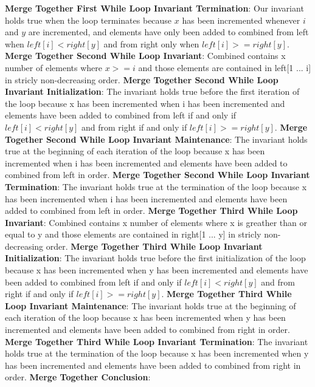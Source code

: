 \documentclass[onecolumn, 12pt, article]{IEEEtran}
\numberwithin{case}{problem}
\numberwithin{condition}{problem}
\numberwithin{condition}{subsection}
\numberwithin{definition}{section}
\theoremstyle{remark}
\numberwithin{question}{problem}
\theoremstyle{plain}
\numberwithin{answer}{problem}
\numberwithin{solution}{section}
\numberwithin{equation}{section}%
\begin{document}
\textbf{Merge Together First While Loop Invariant Termination}: Our invariant holds true when the loop terminates because $x$ has been incremented whenever $i$ and $y$ are incremented, and elements have only been added to combined from left when $left[i] < right[y]$ and from right only when $left[i] >= right[y]$.
\newline
\newline
\textbf{Merge Together Second While Loop Invariant}: Combined contains x number of elements where $x >= i$ and those elements are contained in left[1 ... i] in stricly non-decreasing order.
\newline
\textbf{Merge Together Second While Loop Invariant Initialization}: The invariant holds true before the first iteration of the loop because x has been incremented when i has been incremented and elements have been added to combined from left if and only if $left[i] < right[y]$ and from right if and only if $left[i] >= right[y]$.
\newline
\textbf{Merge Together Second While Loop Invariant Maintenance}: The invariant holds true at the beginning of each iteration of the loop because x has been incremented when i has been incremented and elements have been added to combined from left in order.
\newline
\textbf{Merge Together Second While Loop Invariant Termination}: The invariant holds true at the termination of the loop because x has been incremented when i has been incremented and elements have been added to combined from left in order.
\newline
\newline
\textbf{Merge Together Third While Loop Invariant}: Combined contains x number of elements where x is greather than or equal to y and those elements are contained in right[1 ... y] in stricly non-decreasing order.
\newline
\textbf{Merge Together Third While Loop Invariant Initialization}: The invariant holds true before the first initialization of the loop because x has been incremented when y has been incremented and elements have been added to combined from left if and only if $left[i] < right[y]$ and from right if and only if $left[i] >= right[y]$.
\newline
\textbf{Merge Together Third While Loop Invariant Maintenance}: The invariant holds true at the beginning of each iteration of the loop because x has been incremented when y has been incremented and elements have been added to combined from right in order.
\newline
\textbf{Merge Together Third While Loop Invariant Termination}: The invariant holds true at the termination of the loop because x has been incremented when y has been incremented and elements have been added to combined from right in order.
\newline
\newline
\textbf{Merge Together Conclusion}: %
\newline
\newline
\end{document}
